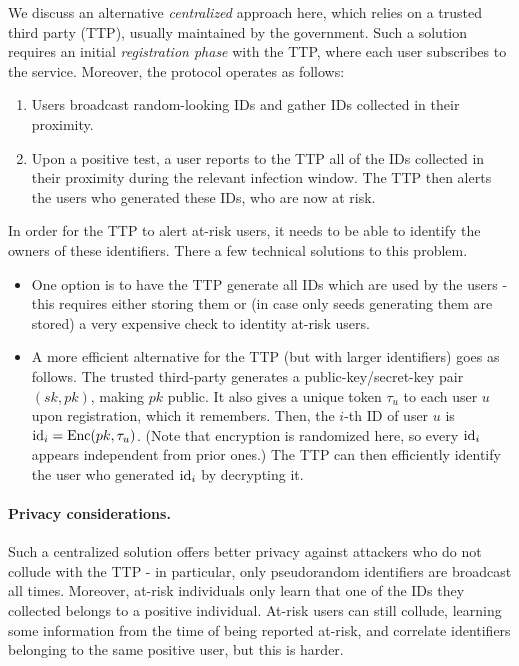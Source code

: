 \documentclass{article}
\begin{document}
We discuss an alternative {\em centralized} approach here, which relies on a trusted third party (TTP), usually maintained by the government. Such a solution requires an initial {\em registration phase} with the TTP, where each user subscribes to the service. Moreover, the protocol operates as follows:
\begin{enumerate}    
\item Users broadcast random-looking IDs and gather IDs collected in their proximity. 
\item Upon a positive test, a user reports to the TTP all of the IDs collected in their proximity during the relevant infection window. The TTP then alerts the users who generated these IDs, who are now at risk.
\end{enumerate}
In order for the TTP to alert at-risk users, it needs to be able to identify the owners of these identifiers. There a few technical solutions to this problem. 
\begin{itemize}
\item One option is to have the TTP generate all IDs which are used by the users - this requires either storing them or (in case only seeds generating them are stored) a very expensive check to identity at-risk users.
\item A more efficient alternative for the TTP (but with larger identifiers) goes as follows. The trusted third-party generates a public-key/secret-key pair $(sk, pk)$, making $pk$ public. It also gives a unique token $\tau_u$ to each user $u$ upon registration, which it remembers. Then, the $i$-th ID of user $u$ is $\mathrm{id}_i = \mathrm{Enc}(pk,\tau_u)$. (Note that encryption is randomized here, so every $\mathrm{id}_i$ appears independent from prior ones.) The TTP can then efficiently identify the user who generated $\mathrm{id}_i$ by decrypting it. 
\end{itemize}

\paragraph{Privacy considerations.} Such a centralized solution offers better privacy against attackers who do not collude with the TTP - in particular, only pseudorandom identifiers are broadcast all times. Moreover, at-risk individuals only learn that one of the IDs they collected belongs to a positive individual. At-risk users can still collude, learning some information from the time of being reported at-risk, and correlate identifiers belonging to the same positive user, but this is harder.  
\end{document}
